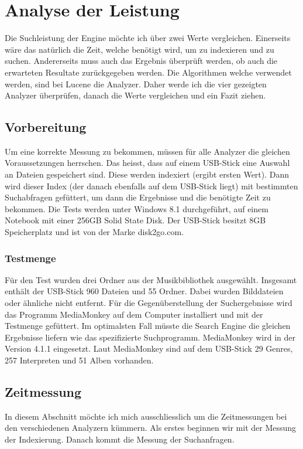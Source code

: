 \documentclass[12pt,a4paper,ngerman]{report}
\begin{document}
\section{Analyse der Leistung}
Die Suchleistung der Engine möchte ich über zwei Werte vergleichen. Einerseits wäre das natürlich die Zeit, welche benötigt wird, um zu indexieren und zu suchen. Andererseits muss auch das Ergebnis überprüft werden, ob auch die erwarteten Resultate zurückgegeben werden. Die Algorithmen welche verwendet werden, sind bei Lucene die Analyzer. Daher werde ich die vier gezeigten Analyzer überprüfen,  danach die Werte vergleichen und ein Fazit ziehen.
\subsection{Vorbereitung}
Um eine korrekte Messung zu bekommen, müssen für alle Analyzer die gleichen Voraussetzungen herrschen. Das heisst, dass auf einem USB-Stick eine Auswahl an Dateien gespeichert sind. Diese werden indexiert (ergibt ersten Wert). Dann wird dieser Index (der danach ebenfalls auf dem USB-Stick liegt) mit bestimmten Suchabfragen gefüttert, um dann die Ergebnisse und die benötigte Zeit zu bekommen. Die Tests werden unter Windows 8.1 durchgeführt, auf einem Notebook mit einer 256GB Solid State Disk. Der USB-Stick besitzt 8GB Speicherplatz und ist von der Marke disk2go.com.\\
\subsubsection{Testmenge}
Für den Test wurden drei Ordner aus der Musikbibliothek ausgewählt. Insgesamt enthält der USB-Stick 960 Dateien und 55 Ordner. Dabei wurden Bilddateien oder ähnliche nicht entfernt. Für die Gegenüberstellung der Suchergebnisse wird das Programm MediaMonkey auf dem Computer installiert und mit der Testmenge gefüttert. Im optimalsten Fall müsste die Search Engine die gleichen Ergebnisse liefern wie das spezifizierte Suchprogramm. MediaMonkey wird in der Version 4.1.1 eingesetzt. Laut MediaMonkey sind auf dem USB-Stick 29 Genres, 257 Interpreten und 51 Alben vorhanden.
\subsection{Zeitmessung}
In diesem Abschnitt möchte ich mich ausschliesslich um die Zeitmessungen bei den verschiedenen Analyzern kümmern. Als erstes beginnen wir mit der Messung der Indexierung. Danach kommt die Messung der Suchanfragen.
\end{document}
